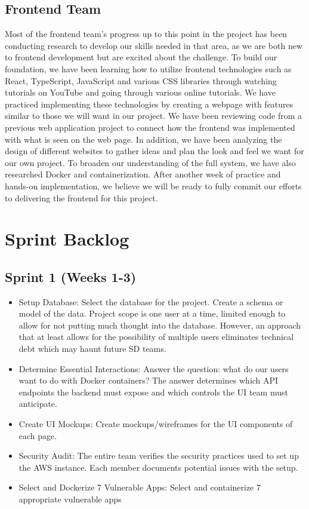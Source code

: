 \documentclass[12pt]{article}
\begin{document}
\subsection {Frontend Team}
Most of the frontend team’s progress up to this point in the project has been conducting research to develop our skills needed in that area, as we are both new to frontend development but are excited about the challenge. To build our foundation, we have been learning how to utilize frontend technologies such as React, TypeScript, JavaScript and various CSS libraries through watching tutorials on YouTube and going through various online tutorials. We have practiced implementing these technologies by creating a webpage with features similar to those we will want in our project. We have been reviewing code from a previous web application project to connect how the frontend was implemented with what is seen on the web page. In addition, we have been analyzing the design of different websites to gather ideas and plan the look and feel we want for our own project. To broaden our understanding of the full system, we have also researched Docker and containerization. After another week of practice and hands-on implementation, we believe we will be ready to fully commit our efforts to delivering the frontend for this project.

\section{Sprint Backlog}
\subsection{Sprint 1 (Weeks 1-3)}
\begin{itemize}
	\item Setup Database:
	      Select the database for the project. Create a schema or model of the data. Project scope is one user at a time, limited enough to allow for not putting much thought into the database. However, an approach that at least allows for the possibility of multiple users eliminates technical debt which may haunt future SD teams.
	\item Determine Essential Interactions:
	      Answer the question: what do our users want to do with Docker containers? The answer determines which API endpoints the backend must expose and which controls the UI team must anticipate.
	\item Create UI Mockups:
	      Create mockups/wireframes for the UI components of each page.
	\item Security Audit:
	      The entire team verifies the security practices used to set up the AWS instance. Each member documents potential issues with the setup.
	\item Select and Dockerize 7 Vulnerable Apps:
	      Select and containerize 7 appropriate vulnerable apps
\end{itemize}
\end{document}
